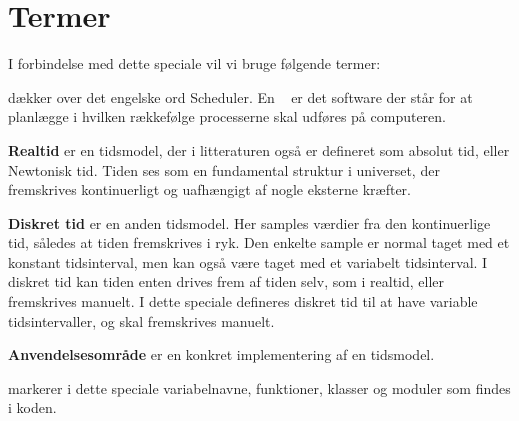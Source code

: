 \section{Termer}
I forbindelse med dette speciale vil vi bruge følgende termer:
\begin{list}{}{}
\item \textbf{\Sched} dækker over det engelske ord Scheduler. En \sched~ er det software der står for at planlægge i hvilken rækkefølge processerne skal udføres på computeren.
\item \textbf{Realtid} er en tidsmodel, der i litteraturen også er defineret som absolut tid, eller Newtonisk tid. Tiden ses som en fundamental struktur i universet, der 
fremskrives kontinuerligt og uafhængigt af nogle eksterne kræfter.
\item \textbf{Diskret tid} er en anden tidsmodel. Her samples værdier fra den kontinuerlige tid, således at tiden fremskrives i ryk. Den enkelte sample er normal taget med et konstant tidsinterval, men kan også være taget med et variabelt tidsinterval. I diskret tid kan tiden enten drives frem af tiden selv, som i realtid, eller fremskrives manuelt. I dette speciale defineres diskret tid til at have variable tidsintervaller, og skal fremskrives manuelt.
\item \textbf{Anvendelsesområde} er en konkret implementering af en tidsmodel.
\item \textbf{} markerer i dette speciale variabelnavne, funktioner,  klasser og moduler som findes i koden. 
\end{list}



